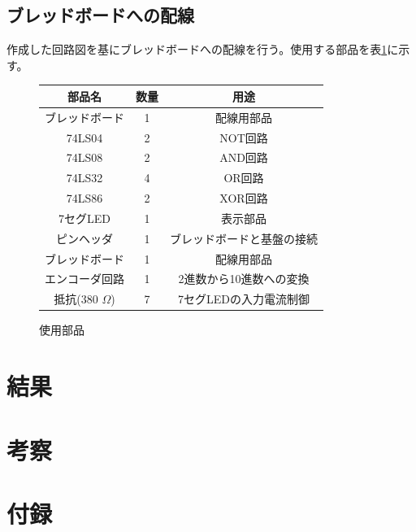 \documentclass[a4paper,11pt,dvipdfmx]{jsarticle}
\begin{document}
\subsection{ブレッドボードへの配線}
作成した回路図を基にブレッドボードへの配線を行う。使用する部品を表\ref{tab:parts}に示す。
\begin{figure}
  \centering
  \begin{tabular}{|c|c|c|}
    \hline
    部品名 & 数量 & 用途 \\
    \hline
    ブレッドボード & 1 & 配線用部品 \\
    74LS04 & 2 & NOT回路 \\
    74LS08 & 2 & AND回路 \\
    74LS32 & 4 & OR回路 \\
    74LS86 & 2 & XOR回路 \\
    7セグLED & 1 & 表示部品 \\
    ピンヘッダ & 1 & ブレッドボードと基盤の接続 \\
    ブレッドボード & 1 & 配線用部品 \\
    エンコーダ回路 & 1 & 2進数から10進数への変換 \\
    抵抗(380 $\Omega$) & 7 & 7セグLEDの入力電流制御 \\
    \hline
  \end{tabular}
  \caption{使用部品}
  \label{tab:parts}
\end{figure}

\section{結果}

\section{考察}

\section{付録}
\end{document}
